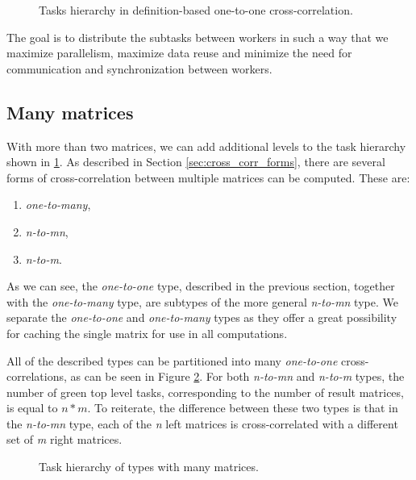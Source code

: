\begin{figure}[h]
	\centering
	\def\svgwidth{\textwidth}
	
	\caption{Tasks hierarchy in definition-based one-to-one cross-correlation.}
	\label{fig:cross_corr_one_to_one_tasks}
\end{figure}

The goal is to distribute the subtasks between workers in such a way that we maximize parallelism, maximize data reuse and minimize the need for communication and synchronization between workers.

\subsection{Many matrices}

With more than two matrices, we can add additional levels to the task hierarchy shown in \ref{fig:cross_corr_one_to_one_tasks}. As described in Section \ref{sec:cross_corr_forms}, there are several forms of cross-correlation between multiple matrices can be computed. These are:
\begin{enumerate}
	\item \textit{one-to-many},
	\item \textit{n-to-mn},
	\item \textit{n-to-m}.
\end{enumerate}

As we can see, the \textit{one-to-one} type, described in the previous section, together with the \textit{one-to-many} type, are subtypes of the more general \textit{n-to-mn} type. We separate the \textit{one-to-one} and \textit{one-to-many} types as they offer a great possibility for caching the single matrix for use in all computations.

All of the described types can be partitioned into many \textit{one-to-one} cross-correlations, as can be seen in Figure \ref{fig:cross_corr_many_tasks}. For both \textit{n-to-mn} and \textit{n-to-m} types, the number of green top level tasks, corresponding to the number of result matrices, is equal to $n*m$. To reiterate, the difference between these two types is that in the \textit{n-to-mn} type, each of the \textit{n} left matrices is cross-correlated with a different set of \textit{m} right matrices.

\begin{figure}[h]
	\centering
	\def\svgwidth{0.8\textwidth}
	
	\caption{Task hierarchy of types with many matrices.}
	\label{fig:cross_corr_many_tasks}
\end{figure}

